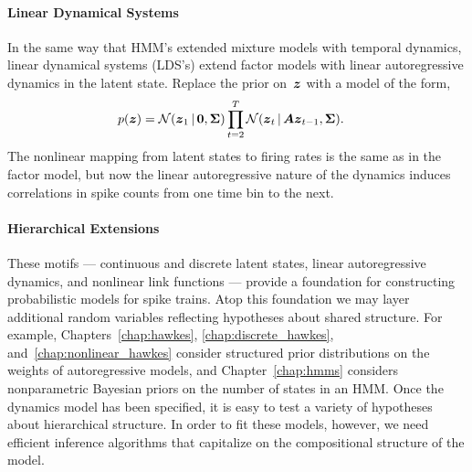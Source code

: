 \paragraph{Linear Dynamical Systems}
In the same way that HMM's extended mixture models with temporal 
dynamics, linear dynamical systems (LDS's) extend factor models
with linear autoregressive dynamics in the latent state. 
Replace the prior on~$\boldsymbol{z}$ with a model of the form,
\begin{align}
  p(\boldsymbol{z}) &= \mathcal{N}(\boldsymbol{z}_1 \,|\, \boldsymbol{0}, \boldsymbol{\Sigma}) \prod_{t=2}^T \mathcal{N}(\boldsymbol{z}_t \,|\, \boldsymbol{A} \boldsymbol{z}_{t-1}, \boldsymbol{\Sigma}).
\end{align}
The nonlinear mapping from latent states to firing rates is the same
as in the factor model, but now the linear autoregressive nature of
the dynamics induces correlations in spike counts from one time bin to
the next.


\paragraph{Hierarchical Extensions}
These motifs --- continuous and discrete latent states, linear autoregressive 
dynamics, and nonlinear link functions --- provide a foundation for 
constructing probabilistic models for spike trains. Atop this foundation 
we may layer additional random variables reflecting hypotheses about shared 
structure. For example, Chapters~\ref{chap:hawkes}, \ref{chap:discrete_hawkes},
and~\ref{chap:nonlinear_hawkes} consider structured prior distributions on 
the weights of autoregressive models, and Chapter~\ref{chap:hmms} considers 
nonparametric Bayesian priors on the number of states in an HMM. Once the 
dynamics model has been specified, it is easy to test a variety of hypotheses
about hierarchical structure. In order to fit these models, however, we need 
efficient inference algorithms that capitalize on the compositional structure 
of the model.



